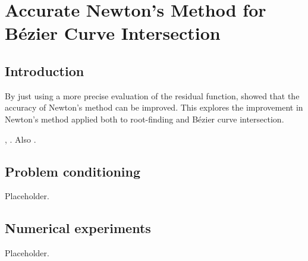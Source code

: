 \chapter{Accurate Newton's Method for B\'{e}zier Curve Intersection}
\label{chap:compensated-newton}

\section{Introduction}

By just using a more precise evaluation of the residual function,
\cite{Tisseur2001} showed that the accuracy of Newton's method can
be improved. This explores the improvement in Newton's method applied both to
root-finding and B\'{e}zier curve intersection.

\cite{Tisseur2001}, \cite{Graillat2008, Du2012, Jiang2013}. Also
\cite{Bates2008}.

\section{Problem conditioning}

Placeholder.

\section{Numerical experiments}

Placeholder.

